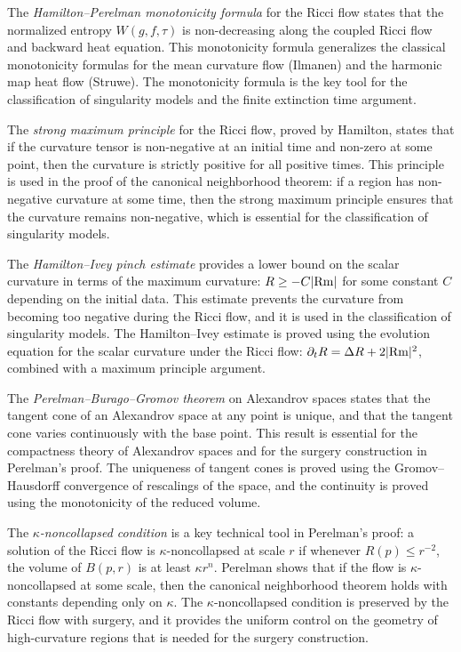 The \emph{Hamilton--Perelman monotonicity formula} for the Ricci flow states that the normalized entropy $W(g,f,\tau)$ is non-decreasing along the coupled Ricci flow and backward heat equation. This monotonicity formula generalizes the classical monotonicity formulas for the mean curvature flow (Ilmanen) and the harmonic map heat flow (Struwe). The monotonicity formula is the key tool for the classification of singularity models and the finite extinction time argument.

The \emph{strong maximum principle} for the Ricci flow, proved by Hamilton, states that if the curvature tensor is non-negative at an initial time and non-zero at some point, then the curvature is strictly positive for all positive times. This principle is used in the proof of the canonical neighborhood theorem: if a region has non-negative curvature at some time, then the strong maximum principle ensures that the curvature remains non-negative, which is essential for the classification of singularity models.

The \emph{Hamilton--Ivey pinch estimate} provides a lower bound on the scalar curvature in terms of the maximum curvature: $R \ge -C |{\rm Rm}|$ for some constant $C$ depending on the initial data. This estimate prevents the curvature from becoming too negative during the Ricci flow, and it is used in the classification of singularity models. The Hamilton--Ivey estimate is proved using the evolution equation for the scalar curvature under the Ricci flow: $\partial_t R = \Delta R + 2|{\rm Rm}|^2$, combined with a maximum principle argument.

The \emph{Perelman--Burago--Gromov theorem} on Alexandrov spaces states that the tangent cone of an Alexandrov space at any point is unique, and that the tangent cone varies continuously with the base point. This result is essential for the compactness theory of Alexandrov spaces and for the surgery construction in Perelman's proof. The uniqueness of tangent cones is proved using the Gromov--Hausdorff convergence of rescalings of the space, and the continuity is proved using the monotonicity of the reduced volume.

The \emph{$\kappa$-noncollapsed condition} is a key technical tool in Perelman's proof: a solution of the Ricci flow is $\kappa$-noncollapsed at scale $r$ if whenever $R(p) \le r^{-2}$, the volume of $B(p,r)$ is at least $\kappa r^n$. Perelman shows that if the flow is $\kappa$-noncollapsed at some scale, then the canonical neighborhood theorem holds with constants depending only on $\kappa$. The $\kappa$-noncollapsed condition is preserved by the Ricci flow with surgery, and it provides the uniform control on the geometry of high-curvature regions that is needed for the surgery construction.

